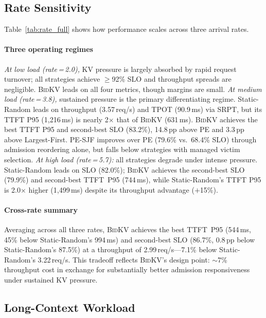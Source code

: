 \documentclass[conference]{IEEEtran}
\newcommand{\bidkv}{\textsc{BidKV}\xspace}
\begin{document}
\subsection{Rate Sensitivity}\label{sec:eval:rate}



Table~\ref{tab:rate_full} shows how performance scales across three arrival
rates.

\paragraph{Three operating regimes}

\emph{At low load (rate\,=\,2.0),}
KV pressure is largely absorbed by rapid request turnover; all strategies
achieve $\geq$92\% SLO and throughput spreads are negligible.  \bidkv leads
on all four metrics, though margins are small.
\emph{At medium load (rate\,=\,3.8),}
sustained pressure is the primary differentiating regime.
Static-Random leads on throughput (3.57\,req/s) and TPOT (90.9\,ms) via
SRPT, but its TTFT P95 (1{,}216\,ms) is nearly 2$\times$ that of \bidkv
(631\,ms).  \bidkv achieves the best TTFT P95 and second-best SLO (83.2\%),
14.8\,pp above PE and 3.3\,pp above Largest-First.
PE-SJF improves over PE (79.6\% vs.\ 68.4\% SLO) through admission
reordering alone, but falls below strategies with managed victim selection.
\emph{At high load (rate\,=\,5.7):}
all strategies degrade under intense pressure.  Static-Random leads on SLO
(82.0\%); \bidkv achieves the second-best SLO (79.9\%) and second-best
TTFT~P95 (744\,ms), while Static-Random's TTFT P95 is 2.0$\times$ higher
(1{,}499\,ms) despite its throughput advantage ($+$15\%).

\paragraph{Cross-rate summary}
Averaging across all three rates, \bidkv achieves the best TTFT~P95
(544\,ms, 45\% below Static-Random's 994\,ms) and second-best SLO (86.7\%,
0.8\,pp below Static-Random's 87.5\%) at a throughput of
2.99\,req/s---7.1\% below Static-Random's 3.22\,req/s.  This tradeoff
reflects \bidkv's design point: ${\sim}$7\% throughput cost in exchange for
substantially better admission responsiveness under sustained KV pressure.

\subsection{Long-Context Workload}\label{sec:eval:long}
\end{document}
